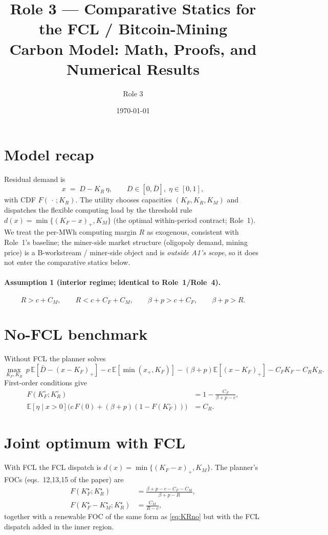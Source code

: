 \documentclass[11pt]{article}
\title{Role 3 --- Comparative Statics for the FCL / Bitcoin-Mining\\
Carbon Model: Math, Proofs, and Numerical Results}
\author{Role 3}
\date{\today}
\theoremstyle{definition}
\begin{document}
\maketitle

\section{Model recap}
Residual demand is
\[
x \;=\; D - K_R\,\eta, \qquad D\in[0,\bar D],\; \eta\in[0,1],
\]
with CDF $F(\,\cdot\,;K_R)$. The utility chooses capacities $(K_F,K_R,K_M)$ and
dispatches the flexible computing load by the threshold rule
$d(x)=\min\{(K_F-x)_+,K_M\}$ (the optimal within-period contract; Role~1).
We treat the per-MWh computing margin $R$ as exogenous, consistent with Role~1's
baseline; the miner-side market structure (oligopoly demand, mining price) is a
B-workstream / miner-side object and is \emph{outside A1's scope}, so it does not
enter the comparative statics below.

\paragraph{Assumption 1 (interior regime; identical to Role~1/Role~4).}
\[
R>c+C_M,\qquad R<c+C_F+C_M,\qquad \beta+p>c+C_F,\qquad \beta+p>R.
\]

\section{No-FCL benchmark}
Without FCL the planner solves
\[
\max_{K_F,K_R}\ p\,\mathbb E[\bar D-(x-K_F)_+]
-c\,\mathbb E[\min(x_+,K_F)]
-(\beta+p)\mathbb E[(x-K_F)_+]
-C_F K_F-C_R K_R.
\]
First-order conditions give
\begin{align}
F(K_F^{\circ};K_R^{\circ}) &= 1-\frac{C_F}{\beta+p-c}, \label{eq:KFno}\\
\mathbb E[\eta\mid x>0]\bigl(c\,F(0)+(\beta+p)(1-F(K_F^{\circ}))\bigr) &=C_R. \label{eq:KRno}
\end{align}

\section{Joint optimum with FCL}
With FCL the FCL dispatch is $d(x)=\min\{(K_F-x)_+,K_M\}$. The planner's FOCs (eqs.~12,13,15 of the paper) are
\begin{align}
F(K_F^{\star};K_R^{\star}) &= \frac{\beta+p-c-C_F-C_M}{\beta+p-R}, \label{eq:KF}\\
F(K_F^{\star}-K_M^{\star};K_R^{\star}) &= \frac{C_M}{R-c}, \label{eq:KM}
\end{align}
together with a renewable FOC of the same form as \eqref{eq:KRno} but with the FCL dispatch added in the inner region.
\end{document}
